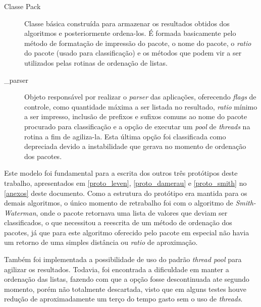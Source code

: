 \begin{description}
	\item[Classe Pack] Classe básica construída para armazenar os resultados obtidos dos algoritmos e posteriormente ordena-los. É formada basicamente pelo método de formatação de impressão do pacote, o nome do pacote, o \textit{ratio} do pacote (usado para classificação) e os métodos que podem vir a ser utilizados pelas rotinas de ordenação de listas.
	\item [\_parser] Objeto responsável por realizar o \textit{parser} das aplicações, oferecendo \textit{flags} de controle, como quantidade máxima a ser listada no resultado, \textit{ratio} mínimo a ser impresso, inclusão de prefixos e sufixos comuns ao nome do pacote procurado para classificação e a opção de executar um \textit{pool} de \textit{threads} na rotina a fim de agiliza-la. Esta última opção foi classificada como depreciada devido a instabilidade que gerava no momento de ordenação dos pacotes.
\end{description}


Este modelo foi fundamental para a escrita dos outros três protótipos deste trabalho, apresentados em \autoref{proto_leven}, \autoref{proto_damerau} e \autoref{proto_smith} no \autoref{anexos} deste documento. Como a estrutura do protótipo era mantida para os demais algoritmos, o único momento de retrabalho foi com o algoritmo de \textit{Smith-Waterman}, onde o pacote retornava uma lista de valores que deviam ser classificados, o que  necessitou a reescrita de um método de ordenação dos pacotes, já que para este algoritmo oferecido pelo pacote em especial não havia um retorno de uma simples distância ou \textit{ratio} de aproximação.

Também foi implementada a possibilidade de uso do padrão \textit{thread pool} para agilizar os resultados. Todavia, foi encontrada a dificuldade em manter a ordenação das listas, fazendo com que a opção fosse descontinuada ate segundo momento, porém não totalmente descartada, visto que em alguns testes houve redução de aproximadamente um terço do tempo gasto sem o uso de \textit{threads}. 
